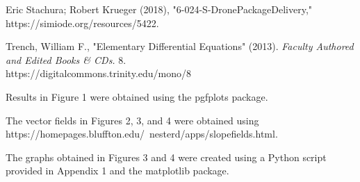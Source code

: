 \documentclass{article}
\begin{document}
    \pagebreak

    \begin{thebibliography}{999}
        Eric Stachura; Robert Krueger (2018), "6-024-S-DronePackageDelivery,"
        https://simiode.org/resources/5422.
        
        Trench, William F., "Elementary Differential Equations" (2013).
        \textit{Faculty Authored and Edited Books & CDs.} 8. \\
        https://digitalcommons.trinity.edu/mono/8

        Results in Figure 1 were obtained using the pgfplots package.

        The vector fields in Figures 2, 3, and 4 were obtained using
        https://homepages.bluffton.edu/~nesterd/apps/slopefields.html.

        The graphs obtained in Figures 3 and 4 were created using a Python
        script provided in Appendix 1 and the matplotlib package.
    \end{thebibliography}

    \pagebreak
\end{document}
